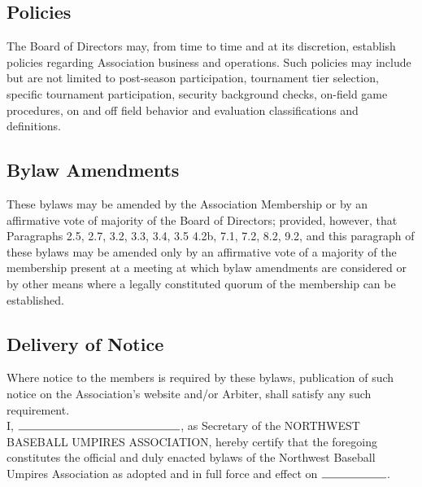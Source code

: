 \documentclass[letterpaper,11pt]{article}
\begin{document}
\subsection{Policies}
The Board of Directors may, from time to time and at its discretion, establish policies regarding Association business and operations. Such policies may include but are not limited to post-season participation, tournament tier selection, specific tournament participation, security background checks, on-field game procedures, on and off field behavior and evaluation classifications and definitions.
\subsection{Bylaw Amendments}
These bylaws may be amended by the Association Membership or by an affirmative vote of majority of the Board of Directors; provided, however, that Paragraphs 2.5, 2.7, 3.2, 3.3, 3.4, 3.5 4.2b, 7.1, 7.2, 8.2, 9.2, and this paragraph of these bylaws may be amended only by an affirmative vote of a majority of the membership present at a meeting at which bylaw amendments are considered or by other means where a legally constituted quorum of the membership can be established.
\subsection{Delivery of Notice}
Where notice to the members is required by these bylaws, publication of such notice on the Association's website and/or Arbiter, shall satisfy any such requirement. \\[12pt]

I, $\rule{5cm}{0.15mm}$, as Secretary of the NORTHWEST BASEBALL UMPIRES ASSOCIATION, hereby certify that the foregoing constitutes the official and duly enacted bylaws of the Northwest Baseball Umpires Association as adopted and in full force and effect on $\rule{2cm}{0.15mm}$.
\end{document}
